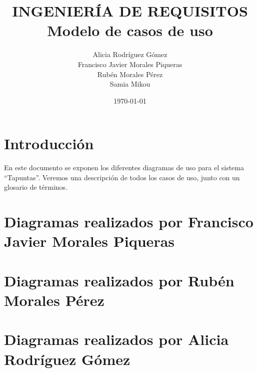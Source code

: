\documentclass[11pt,spanish]{article} %
\title{INGENIERÍA DE REQUISITOS \\
	Modelo de casos de uso}
\author{Alicia Rodríguez Gómez \\
	Francisco Javier Morales Piqueras \\
	Rubén Morales Pérez \\
	Samia Mikou}
\date{\today}
\begin{document}
\maketitle
\tableofcontents %
\setlength\parindent{0pt} %

\vspace{5cm}
\section{Introducción}
En este documento se exponen los diferentes diagramas de uso  para el sistema “Tapuntas”. Veremos una descripción de todos los casos de uso, junto con un glosario de términos.



\section{Diagramas realizados por Francisco Javier Morales Piqueras}


\newpage


\section{Diagramas realizados por Rubén Morales Pérez}


\newpage

\section{Diagramas realizados por Alicia Rodríguez Gómez}


\newpage
\end{document}
